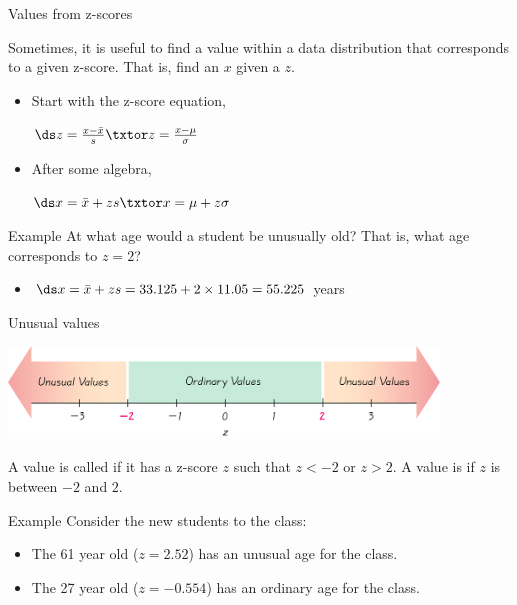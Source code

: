 \documentclass[xcolor=table]{beamer}
\begin{document}
\begin{frame}{Values from z-scores}
\begin{block}{}
\large
Sometimes, it is useful to find a value within a data distribution that corresponds to a given z-score. That is, find an $x$ given a $z$. 
\medskip
\begin{itemize}
\pause\item Start with the z-score equation, \\
\smallskip
{\centering $\ds z = \frac{x - \bar x}{s} \txtor z = \frac{x - \mu}{\sigma}$ \par}
\pause\item After some algebra,\\
\smallskip
{\centering $\ds x = \bar x + z s \txtor x = \mu + z \sigma$ \par}
\end{itemize}
\end{block}

\pause
\begin{exampleblock}{Example}
At what age would a student be unusually old? That is, what age corresponds to $z=2$?\\
\medskip
\begin{itemize}
\pause\item $\ds x = \bar x + z s = 33.125 + 2 \times 11.05 =  55.225$ years
\end{itemize}
\end{exampleblock}
\end{frame}

\begin{frame}{Unusual values}

{\centering
\includegraphics[width=4.5in]{../images/ch03_unusual} \par
}

\begin{block}{}
\large
A value is called  if it has a z-score $z$ such that $z< -2$ or $z > 2$. A value is  if $z$ is between $-2$ and $2$.
\end{block}

\pause
\begin{exampleblock}{Example}
Consider the new students to the class:
\begin{itemize}
\item The 61 year old ($z=2.52$) has an unusual age for the class. 
\item The 27 year old ($z=-0.554$) has an ordinary age for the class.
\end{itemize}
\end{exampleblock}
\end{frame}
\end{document}
